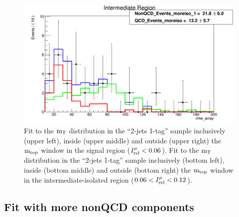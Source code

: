 {\begin{figure}[h!]
{\begin{centering}
\includegraphics[scale=0.2]{figures/2J1T/MTW_fit_2j1t_moreiso_SB_GreaterThan10}
\par\end{centering}
}
\caption{Fit to the ${\rm m_{T}}$ distribution in the \textquotedblleft{}2-jets
1-tag\textquotedblright{} sample inclusively (upper left), inside
(upper middle) and outside (upper right) the ${\rm m_{top}}$ window in
the signal region ($I_{\rm rel}^{\mu} < 0.06$). Fit to the ${\rm m_{T}}$ distribution in the
\textquotedblleft{}2-jets 1-tag\textquotedblright{} sample inclusively
(bottom left), inside (bottom middle) and outside (bottom right) the ${\rm m_{top}}$
window in the intermediate-isolated region ($0.06 < I_{\rm rel}^{\mu} < 0.12$). }
\end{figure}

\clearpage

\subsection{Fit with more nonQCD components}

}
